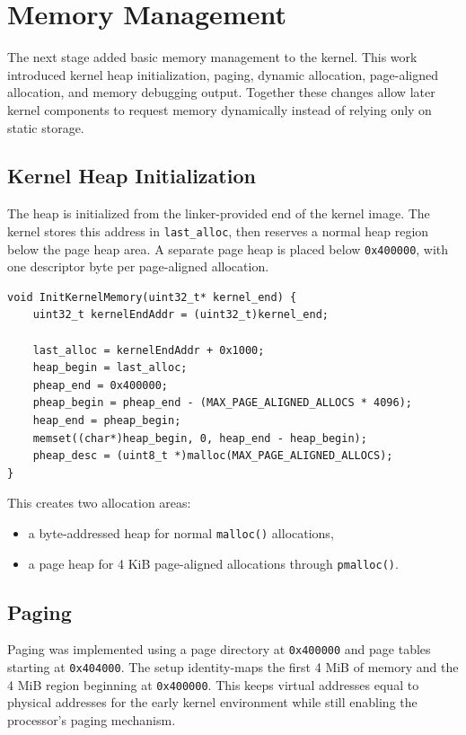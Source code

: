 \section{Memory Management}

The next stage added basic memory management to the kernel. This work introduced kernel heap initialization, paging, dynamic allocation, page-aligned allocation, and memory debugging output. Together these changes allow later kernel components to request memory dynamically instead of relying only on static storage.

\subsection{Kernel Heap Initialization}
The heap is initialized from the linker-provided end of the kernel image. The kernel stores this address in \texttt{last\_alloc}, then reserves a normal heap region below the page heap area. A separate page heap is placed below \texttt{0x400000}, with one descriptor byte per page-aligned allocation.

\begin{listing}[H]
\begin{verbatim}
void InitKernelMemory(uint32_t* kernel_end) {
    uint32_t kernelEndAddr = (uint32_t)kernel_end;

    last_alloc = kernelEndAddr + 0x1000;
    heap_begin = last_alloc;
    pheap_end = 0x400000;
    pheap_begin = pheap_end - (MAX_PAGE_ALIGNED_ALLOCS * 4096);
    heap_end = pheap_begin;
    memset((char*)heap_begin, 0, heap_end - heap_begin);
    pheap_desc = (uint8_t *)malloc(MAX_PAGE_ALIGNED_ALLOCS);
}
\end{verbatim}
\caption{Kernel heap initialization using the linker-provided kernel end symbol.}
\end{listing}

This creates two allocation areas:
\begin{itemize}
  \item a byte-addressed heap for normal \texttt{malloc()} allocations,
  \item a page heap for 4 KiB page-aligned allocations through \texttt{pmalloc()}.
\end{itemize}

\subsection{Paging}
Paging was implemented using a page directory at \texttt{0x400000} and page tables starting at \texttt{0x404000}. The setup identity-maps the first 4 MiB of memory and the 4 MiB region beginning at \texttt{0x400000}. This keeps virtual addresses equal to physical addresses for the early kernel environment while still enabling the processor's paging mechanism.

